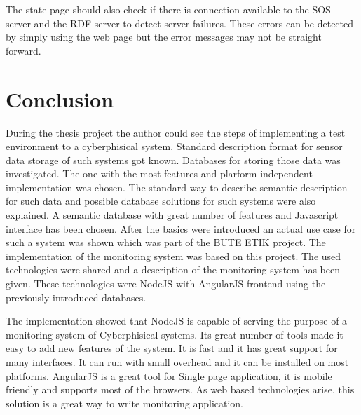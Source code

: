 The state page should also check if there is connection available to the SOS server and the RDF server to detect server failures. These errors can be detected by simply using the web page but the error messages may not be straight forward.

\section{Conclusion}
During the thesis project the author could see the steps of implementing a test environment to a cyberphisical system. Standard description format for sensor data storage of such systems got known. Databases for storing those data was investigated. The one with the most features and plarform independent implementation was chosen. The standard way to describe semantic description for such data and possible database solutions for such systems were also explained. A semantic database with great number of features and Javascript interface has been chosen. After the basics were introduced an actual use case for such a system was shown which was part of the BUTE ETIK project. The implementation of the monitoring system was based on this project. The used technologies were shared and a description of the monitoring system has been given. These technologies were NodeJS with AngularJS frontend using the previously introduced databases. 

The implementation showed that NodeJS is capable of serving the purpose of a monitoring system of Cyberphisical systems. Its great number of tools made it easy to add new features of the system. It is fast and it has great support for many interfaces. It can run with small overhead and it can be installed on most platforms. AngularJS is a great tool for Single page application, it is mobile friendly and supports most of the browsers. As web based technologies arise, this solution is a great way to write monitoring application. 

